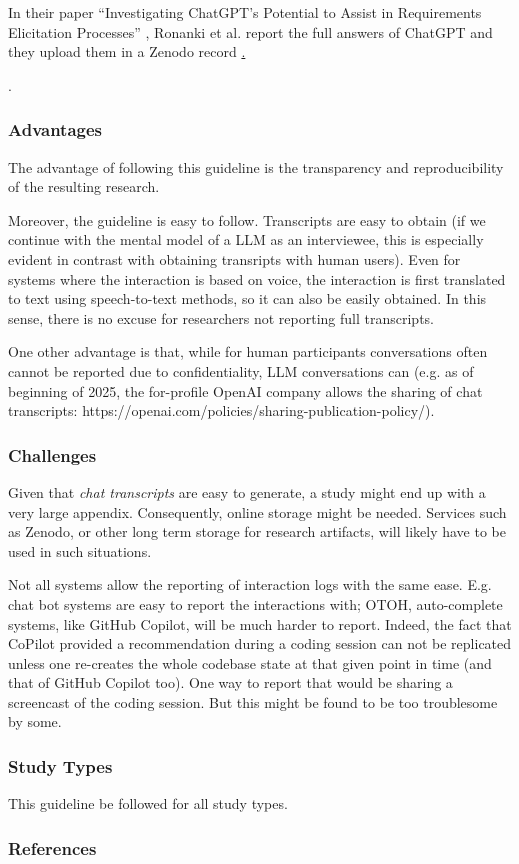 \documentclass[11pt]{article}
\begin{document}
In their paper ``Investigating ChatGPT's Potential to Assist in Requirements Elicitation Processes'' \cite{ronanki2023investigating}, Ronanki et al. report the full answers of ChatGPT and they upload them in a Zenodo record \href{https://zenodo.org/records/8124936}. 

. 


\subsubsection{Advantages}

The advantage of following this guideline is the transparency and reproducibility of the resulting research. 

Moreover, the guideline is easy to follow. Transcripts are easy to obtain (if we continue with the mental model of a LLM as an interviewee, this is especially evident in contrast with obtaining transripts with human users). Even for systems where the interaction is based on voice, the interaction is first translated to text using speech-to-text methods, so it can also be easily obtained. In this sense, there is no excuse for researchers not reporting full transcripts. 

One other advantage is that, while for human participants conversations often cannot be reported due to confidentiality, LLM conversations can (e.g. as of beginning of 2025, the for-profile OpenAI company allows the sharing of chat transcripts: https://openai.com/policies/sharing-publication-policy/). 


\subsubsection{Challenges}

Given that {\em chat transcripts} are easy to generate, a study might end up with a very large appendix. Consequently, online storage might be needed. Services such as Zenodo, or other long term storage for research artifacts, will likely have to be used in such situations.

Not all systems allow the reporting of interaction logs with the same ease. E.g. chat bot systems are easy to report the interactions with; OTOH, auto-complete systems, like GitHub Copilot, will be much harder to report. Indeed, the fact that CoPilot provided a recommendation during a coding session can not be replicated unless one re-creates the whole codebase state at that given point in time (and that of GitHub Copilot too). One way to report that would be sharing a screencast of the coding session. But this might be found to be too troublesome by some. 


\subsubsection{Study Types}

This guideline \should be followed for all study types. 


\subsubsection{References}



\end{document}
